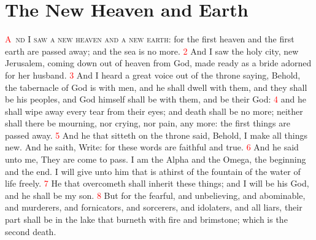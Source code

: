 \documentclass[12pt,twoside]{memoir}
\newcommand{\vnum}[1]{\textcolor{red}{\normalsize{#1}}}
\begin{document}

\chapter{The New Heaven and Earth}
\lettrine[lines=3,slope=-0.5em]{\textcolor{red}{A}}{\ nd I saw a new heaven and a new earth}: for the first heaven and the first earth are passed away; and the sea is no more. 
\vnum{2} And I saw the holy city, new Jerusalem, coming down out of heaven from God, made ready as a bride adorned for her husband. 
\vnum{3} And I heard a great voice out of the throne saying, Behold, the tabernacle of God is with men, and he shall dwell with them, and they shall be his peoples, and God himself shall be with them, and be their God: 
\vnum{4} and he shall wipe away every tear from their eyes; and death shall be no more; neither shall there be mourning, nor crying, nor pain, any more: the first things are passed away. 
\vnum{5} And he that sitteth on the throne said, Behold, I make all things new. And he saith, Write: for these words are faithful and true. 
\vnum{6} And he said unto me, They are come to pass. I am the Alpha and the Omega, the beginning and the end. I will give unto him that is athirst of the fountain of the water of life freely. 
\vnum{7} He that overcometh shall inherit these things; and I will be his God, and he shall be my son. 
\vnum{8} But for the fearful, and unbelieving, and abominable, and murderers, and fornicators, and sorcerers, and idolaters, and all liars, their part shall be in the lake that burneth with fire and brimstone; which is the second death.
\end{document}
